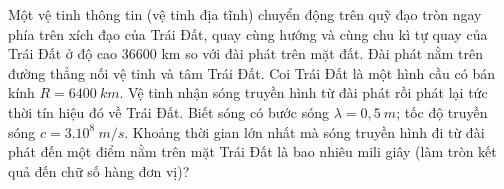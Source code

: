 \begin{vidu}
Một vệ tinh thông tin (vệ tinh địa tĩnh) chuyển động trên quỹ đạo tròn ngay phía trên xích đạo của Trái Đất, quay cùng hướng và cùng chu kì tự quay của Trái Đất ở độ cao 36600 km so với đài phát trên mặt đất. Đài phát nằm trên đường thẳng nối vệ tinh và tâm Trái Đất. Coi Trái Đất là một hình cầu có bán kính $R=6400\ km$. Vệ tinh nhận sóng truyền hình từ đài phát rồi phát lại tức thời tín hiệu đó về Trái Đất. Biết sóng có bước sóng $\lambda=0,5\ m$; tốc độ truyền sóng $c=3.10^8\ m/s$. Khoảng thời gian lớn nhất mà sóng truyền hình đi từ đài phát đến một điểm nằm trên mặt Trái Đất là bao nhiêu mili giây (làm tròn kết quả đến chữ số hàng đơn vị)?
\end{vidu} %


